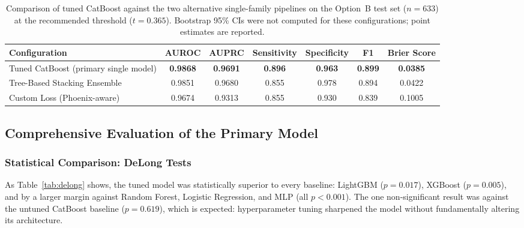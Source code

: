 \documentclass[final,3p,times]{elsarticle}
\begin{document}
\begin{table}[htbp]
\centering
\caption{Comparison of tuned CatBoost against the two alternative single-family pipelines on the Option~B test set ($n = 633$) at the recommended threshold ($t = 0.365$). Bootstrap 95\% CIs were not computed for these configurations; point estimates are reported.}
\label{tab:novel_comparison}
\begin{tabular}{lcccccc}
\toprule
\textbf{Configuration} & \textbf{AUROC} & \textbf{AUPRC} & \textbf{Sensitivity} & \textbf{Specificity} & \textbf{F1} & \textbf{Brier Score} \\
\midrule
Tuned CatBoost (primary single model) & \textbf{0.9868} & \textbf{0.9691} & \textbf{0.896} & \textbf{0.963} & \textbf{0.899} & \textbf{0.0385} \\
Tree-Based Stacking Ensemble & 0.9851 & 0.9680 & 0.855 & 0.978 & 0.894 & 0.0422 \\
Custom Loss (Phoenix-aware) & 0.9674 & 0.9313 & 0.855 & 0.930 & 0.839 & 0.1005 \\
\bottomrule
\end{tabular}
\end{table}

\subsection{Comprehensive Evaluation of the Primary Model}
\label{subsec:primary_eval}

\subsubsection{Statistical Comparison: DeLong Tests}

As Table~\ref{tab:delong} shows, the tuned model was statistically
superior to every baseline: LightGBM ($p = 0.017$), XGBoost
($p = 0.005$), and by a larger margin against Random Forest,
Logistic Regression, and MLP (all $p < 0.001$). The one
non-significant result was against the untuned CatBoost baseline
($p = 0.619$), which is expected: hyperparameter tuning sharpened
the model without fundamentally altering its architecture.
\end{document}
